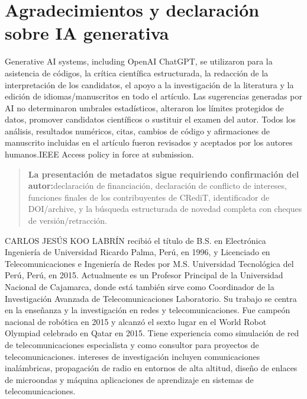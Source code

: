 \documentclass{ieeeaccess}
\begin{document}
\section*{Agradecimientos y declaración sobre IA generativa}\label{agradecimientos-y-declaraciuxf3n-sobre-ia-generativa}

Generative AI systems, including OpenAI ChatGPT, se utilizaron para la asistencia de códigos, la crítica científica estructurada, la redacción de la interpretación de los candidatos, el apoyo a la investigación de la literatura y la edición de idiomas/manuscritos en todo el artículo. Las sugerencias generadas por AI no determinaron umbrales estadísticos, alteraron los límites protegidos de datos, promover candidatos científicos o sustituir el examen del autor. Todos los análisis, resultados numéricos, citas, cambios de código y afirmaciones de manuscrito incluidas en el artículo fueron revisados y aceptados por los autores humanos.IEEE Access policy in force at submission.

\begin{quote}
\textbf{La presentación de metadatos sigue requiriendo confirmación del autor:}declaración de financiación, declaración de conflicto de intereses, funciones finales de los contribuyentes de CRediT, identificador de DOI/archive, y la búsqueda estructurada de novedad completa con cheques de versión/retracción.
\end{quote}


\begin{IEEEbiographynophoto}{CARLOS JESÚS KOO LABRÍN}
recibió el título de B.S. en Electrónica Ingeniería de Universidad Ricardo Palma, Perú, en 1996, y Licenciado en Telecomunicaciones e Ingeniería de Redes por M.S. Universidad Tecnológica del Perú, Perú, en 2015. Actualmente es un Profesor Principal de la Universidad Nacional de Cajamarca, donde está también sirve como Coordinador de la Investigación Avanzada de Telecomunicaciones Laboratorio. Su trabajo se centra en la enseñanza y la investigación en redes y telecomunicaciones. Fue campeón nacional de robótica en 2015 y alcanzó el sexto lugar en el World Robot Olympiad celebrado en Qatar en 2015. Tiene experiencia como simulación de red de telecomunicaciones especialista y como consultor para proyectos de telecomunicaciones. intereses de investigación incluyen comunicaciones inalámbricas, propagación de radio en entornos de alta altitud, diseño de enlaces de microondas y máquina aplicaciones de aprendizaje en sistemas de telecomunicaciones.
\end{IEEEbiographynophoto}
\end{document}
